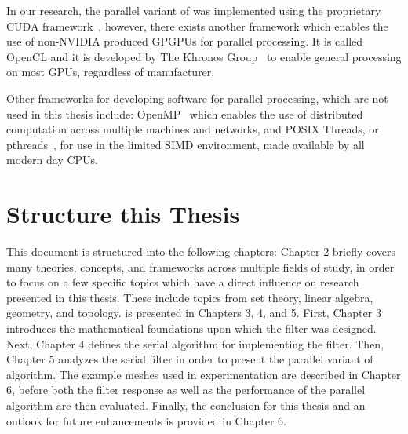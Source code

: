 In our research, the parallel variant of  was implemented using the proprietary CUDA framework~\cite{CUDA17}, however, there exists another framework which enables the use of non-NVIDIA produced \glspl{GPGPU} for parallel processing. It is called OpenCL and it is developed by The Khronos Group~\cite{Khronos19} to enable general processing on most \glspl{GPU}, regardless of manufacturer.

Other frameworks for developing software for parallel processing, which are not used in this thesis include: OpenMP~\cite{OpenMP19} which enables the use of distributed computation across multiple machines and networks, and POSIX Threads, or pthreads~\cite[p.~195-210]{Lang17}, for use in the limited \gls{SIMD} environment, made available by all modern day \glspl{CPU}.

%
%
%
%
%
%
\section{Structure this Thesis}
This document is structured into the following chapters: Chapter 2 briefly covers many theories, concepts, and frameworks across multiple fields of study, in order to focus on a few specific topics which have a direct influence on research presented in this thesis. These include topics from set theory, linear algebra, geometry, and topology.  is presented in Chapters 3, 4, and 5. First, Chapter 3 introduces the mathematical foundations upon which the filter was designed. Next, Chapter 4 defines the serial algorithm for implementing the filter. Then, Chapter 5 analyzes the serial filter in order to present the parallel variant of  algorithm. The example meshes used in experimentation are described in Chapter 6, before both the filter response as well as the performance of the parallel algorithm are then evaluated. Finally, the conclusion for this thesis and an outlook for future enhancements is provided in Chapter 6.
